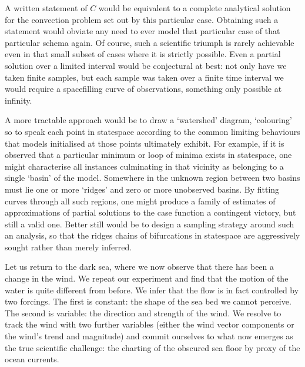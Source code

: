 \documentclass[letterpaper,10pt,english]{jupyterBook}
\begin{document}
\sphinxAtStartPar
A written statement of \(C\) would be equivalent to a complete analytical solution for the convection problem set out by this particular case. Obtaining such a statement would obviate any need to ever model that particular case of that particular schema again. Of course, such a scientific triumph is rarely achievable even in that small subset of cases where it is strictly possible. Even a partial solution over a limited interval would be conjectural at best: not only have we taken finite samples, but each sample was taken over a finite time interval \sphinxhyphen{} we would require a space\sphinxhyphen{}filling curve of observations, something only possible at infinity.

\sphinxAtStartPar
A more tractable approach would be to draw a ‘watershed’ diagram, ‘colouring’ \sphinxhyphen{} so to speak \sphinxhyphen{} each point in state\sphinxhyphen{}space according to the common limiting behaviours that models initialised at those points ultimately exhibit. For example, if it is observed that a particular minimum or loop of minima exists in state\sphinxhyphen{}space, one might characterise all instances culminating in that vicinity as belonging to a single ‘basin’ of the model. Somewhere in the unknown region between two basins must lie one or more ‘ridges’ and zero or more unobserved basins. By fitting curves through all such regions, one might produce a family of estimates of approximations of partial solutions to the case function \sphinxhyphen{} a contingent victory, but still a valid one. Better still would be to design a sampling strategy around such an analysis, so that the ridges \sphinxhyphen{} chains of bifurcations in state\sphinxhyphen{}space \sphinxhyphen{} are aggressively sought rather than merely inferred.

\sphinxAtStartPar
Let us return to the dark sea, where we now observe that there has been a change in the wind. We repeat our experiment and find that the motion of the water is quite different from before. We infer that the flow is in fact controlled by two forcings. The first is constant: the shape of the sea bed we cannot perceive. The second is variable: the direction and strength of the wind. We resolve to track the wind with two further variables (either the wind vector components or the wind’s trend and magnitude) and commit ourselves to what now emerges as the true scientific challenge: the charting of the obscured sea floor by proxy of the ocean currents.
\end{document}
